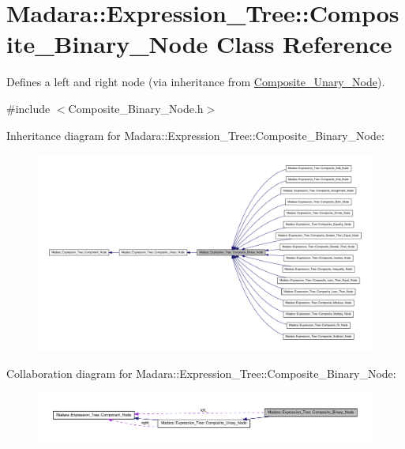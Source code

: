 \hypertarget{classMadara_1_1Expression__Tree_1_1Composite__Binary__Node}{
\section{Madara::Expression\_\-Tree::Composite\_\-Binary\_\-Node Class Reference}
\label{df/d55/classMadara_1_1Expression__Tree_1_1Composite__Binary__Node}
}


Defines a left and right node (via inheritance from \hyperlink{classMadara_1_1Expression__Tree_1_1Composite__Unary__Node}{Composite\_\-Unary\_\-Node}).  




{\ttfamily \#include $<$Composite\_\-Binary\_\-Node.h$>$}



Inheritance diagram for Madara::Expression\_\-Tree::Composite\_\-Binary\_\-Node:
\nopagebreak
\begin{figure}[H]
\begin{center}
\leavevmode
\includegraphics[width=400pt]{d5/da3/classMadara_1_1Expression__Tree_1_1Composite__Binary__Node__inherit__graph}
\end{center}
\end{figure}


Collaboration diagram for Madara::Expression\_\-Tree::Composite\_\-Binary\_\-Node:
\nopagebreak
\begin{figure}[H]
\begin{center}
\leavevmode
\includegraphics[width=400pt]{df/d61/classMadara_1_1Expression__Tree_1_1Composite__Binary__Node__coll__graph}
\end{center}
\end{figure}
